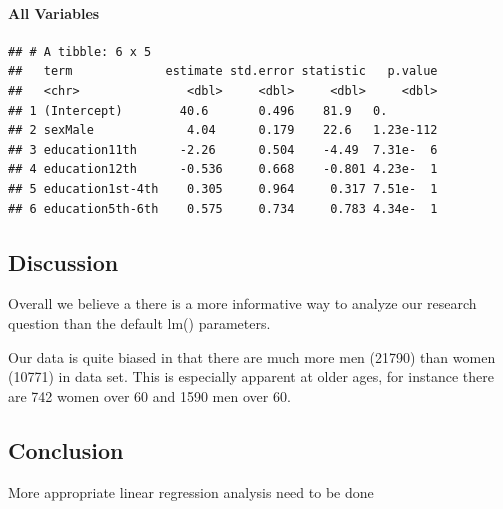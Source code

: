 \documentclass[]{article}
\let\oldparagraph\paragraph
\renewcommand{\paragraph}[1]{\oldparagraph{#1}\mbox{}}
\begin{document}
\hypertarget{all-variables}{%
\paragraph{All Variables}\label{all-variables}}

\begin{verbatim}
## # A tibble: 6 x 5
##   term             estimate std.error statistic   p.value
##   <chr>               <dbl>     <dbl>     <dbl>     <dbl>
## 1 (Intercept)        40.6       0.496    81.9   0.       
## 2 sexMale             4.04      0.179    22.6   1.23e-112
## 3 education11th      -2.26      0.504    -4.49  7.31e-  6
## 4 education12th      -0.536     0.668    -0.801 4.23e-  1
## 5 education1st-4th    0.305     0.964     0.317 7.51e-  1
## 6 education5th-6th    0.575     0.734     0.783 4.34e-  1
\end{verbatim}

\hypertarget{discussion}{%
\subsection{Discussion}\label{discussion}}

Overall we believe a there is a more informative way to analyze our
research question than the default lm() parameters.

Our data is quite biased in that there are much more men (21790) than
women (10771) in data set. This is especially apparent at older ages,
for instance there are 742 women over 60 and 1590 men over 60.

\hypertarget{conclusion}{%
\subsection{Conclusion}\label{conclusion}}

More appropriate linear regression analysis need to be done
\end{document}
